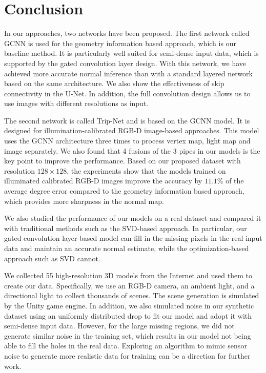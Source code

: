
\chapter{Conclusion} %

\label{ch:06} %


In our approaches, two networks have been proposed. The first network called GCNN is used for the geometry information based approach, which is our baseline method. It is particularly well suited for semi-dense input data, which is supported by the gated convolution layer design.  With this network, we have achieved more accurate normal inference than with a standard layered network based on the same architecture. We also show the effectiveness of skip connectivity in the U-Net. In addition, the full convolution design allows us to use images with different resolutions as input. 

The second network is called Trip-Net and is based on the GCNN model. It is designed for illumination-calibrated RGB-D image-based approaches. This model uses the GCNN architecture three times to process vertex map, light map and image separately. We also found that 4 fusions of the 3 pipes in our models is the key point to improve the performance.
Based on our proposed dataset with resolution $ 128\times 128 $, the experiments show that the models trained on illuminated calibrated RGB-D images improve the accuracy by $ 11.1\% $ of the average degree error compared to the geometry information based approach, which provides more sharpness in the normal map.


We also studied the performance of our models on a real dataset and compared it with traditional methods such as the SVD-based approach. In particular, our gated convolution layer-based model can fill in the missing pixels in the real input data and maintain an accurate normal estimate, while the optimization-based approach such as SVD cannot. 


We collected 55 high-resolution 3D models from the Internet and used them to create our data. Specifically, we use an RGB-D camera, an ambient light, and a directional light to collect thousands of scenes. The scene generation is simulated by the Unity game engine. In addition, we also simulated noise in our synthetic dataset using an uniformly distributed drop to fit our model and adopt it with semi-dense input data.
However, for the large missing regions, we did not generate similar noise in the training set, which results in our model not being able to fill the holes in the real data. Exploring an algorithm to mimic sensor noise to generate more realistic data for training can be a direction for further work.
